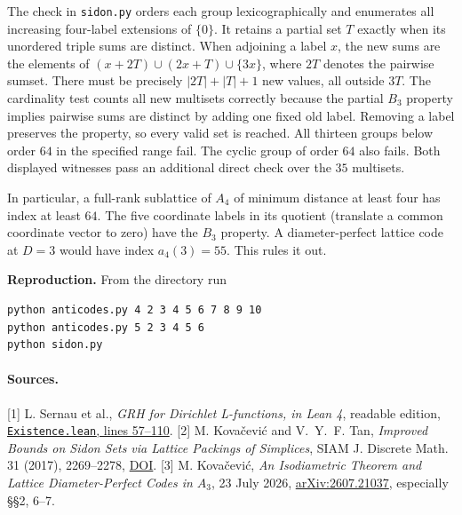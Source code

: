 The check in \texttt{sidon.py} orders each group lexicographically and
enumerates all increasing four-label extensions of $\{0\}$. It retains
a partial set $T$ exactly when its unordered triple sums are distinct.
When adjoining a label $x$, the new sums are the elements of
$(x+2T)\cup(2x+T)\cup\{3x\}$, where $2T$ denotes the pairwise sumset.
There must be precisely $|2T|+|T|+1$ new values, all outside $3T$.
The cardinality test counts all new multisets correctly because the
partial $B_3$ property implies pairwise sums are distinct
by adding one fixed old label. Removing a label preserves the property,
so every valid set is reached. All thirteen groups below order $64$
in the specified range fail. The cyclic group of order $64$ also fails.
Both displayed witnesses pass an additional direct check over the $35$ multisets.

In particular, a full-rank sublattice of $A_4$ of minimum distance at
least four has index at least $64$. The five coordinate labels in its
quotient (translate a common coordinate vector to zero) have the $B_3$
property. A diameter-perfect lattice code at $D=3$ would have index
$a_4(3)=55$. This rules it out.

\textbf{Reproduction.}
From the directory  run
\begin{verbatim}
python anticodes.py 4 2 3 4 5 6 7 8 9 10
python anticodes.py 5 2 3 4 5 6
python sidon.py
\end{verbatim}

\paragraph{Sources.} [1] L. Sernau et al., \emph{GRH for Dirichlet
L-functions, in Lean 4}, readable edition,
\href{https://github.com/lsernau/grh-lean/blob/72fead102f663d5c7a407964a13dc0cf9d977207/grh/src/New/Reduction/Data/Existence.lean\#L57-L110}{\texttt{Existence.lean}, lines 57--110}.
[2] M. Kova\v cevi\'c and V.~Y.~F. Tan, \emph{Improved Bounds on
Sidon Sets via Lattice Packings of Simplices}, SIAM J. Discrete Math. 31
(2017), 2269--2278, \href{https://doi.org/10.1137/16M1099182}{DOI}.
[3] M. Kova\v cevi\'c, \emph{An Isodiametric Theorem and Lattice
Diameter-Perfect Codes in $A_3$}, 23 July 2026,
\href{https://arxiv.org/abs/2607.21037}{arXiv:2607.21037}, especially
\S\S2, 6--7.
